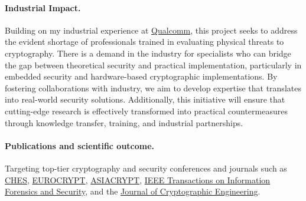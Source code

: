 \documentclass[11pt, a4paper]{article}
\begin{document}
\paragraph{Industrial Impact.}
Building on my industrial experience at 
\href{https://www.qualcomm.com/}{Qualcomm}, this project seeks to 
address the evident shortage of professionals trained in evaluating 
physical threats to cryptography. There is a demand in the 
industry for specialists who can bridge the gap between theoretical 
security and practical implementation, particularly in embedded 
security and hardware-based cryptographic implementations. By 
fostering collaborations with industry, we aim to develop expertise that translates 
into real-world security solutions. Additionally, this initiative 
will ensure that cutting-edge research is effectively transformed 
into practical countermeasures through knowledge transfer, 
training, and industrial partnerships.


\paragraph{Publications and scientific outcome.} Targeting top-tier cryptography and security conferences and journals such as 
\href{https://ches.iacr.org/index.php}{CHES}, \href{https://eurocrypt.iacr.org/}{EUROCRYPT}, 
\href{https://asiacrypt.iacr.org/}{ASIACRYPT}, 
\href{https://ieeexplore.ieee.org/xpl/RecentIssue.jsp?punumber=10206}{IEEE Transactions on Information Forensics and Security}, 
and the \href{https://link.springer.com/journal/13389}{Journal of Cryptographic Engineering}. 
\end{document}
